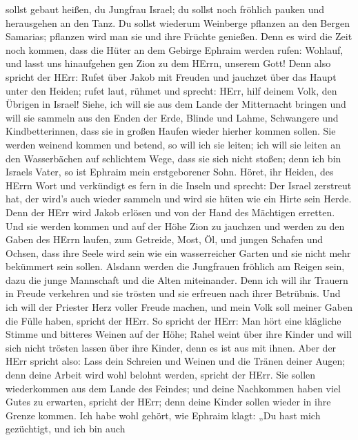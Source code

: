 sollst gebaut heißen, du Jungfrau Israel; du sollst noch fröhlich pauken
und herausgehen an den Tanz.  Du sollst wiederum Weinberge
pflanzen an den Bergen Samarias; pflanzen wird man sie und ihre Früchte
genießen.  Denn es wird die Zeit noch kommen, dass die Hüter
an dem Gebirge Ephraim werden rufen: Wohlauf, und lasst uns hinaufgehen
gen Zion zu dem HErrn, unserem Gott!  Denn also spricht der
HErr: Rufet über Jakob mit Freuden und jauchzet über das Haupt unter den
Heiden; rufet laut, rühmet und sprecht: HErr, hilf deinem Volk, den
Übrigen in Israel!  Siehe, ich will sie aus dem Lande der
Mitternacht bringen und will sie sammeln aus den Enden der Erde, Blinde
und Lahme, Schwangere und Kindbetterinnen, dass sie in großen Haufen
wieder hierher kommen sollen.  Sie werden weinend kommen und
betend, so will ich sie leiten; ich will sie leiten an den Wasserbächen
auf schlichtem Wege, dass sie sich nicht stoßen; denn ich bin Israels
Vater, so ist Ephraim mein erstgeborener Sohn.  Höret, ihr
Heiden, des HErrn Wort und verkündigt es fern in die Inseln und sprecht:
Der Israel zerstreut hat, der wird's auch wieder sammeln und wird sie
hüten wie ein Hirte sein Herde.  Denn der HErr wird Jakob
erlösen und von der Hand des Mächtigen erretten.  Und sie
werden kommen und auf der Höhe Zion zu jauchzen und werden zu den Gaben
des HErrn laufen, zum Getreide, Most, Öl, und jungen Schafen und Ochsen,
dass ihre Seele wird sein wie ein wasserreicher Garten und sie nicht
mehr bekümmert sein sollen.  Alsdann werden die Jungfrauen
fröhlich am Reigen sein, dazu die junge Mannschaft und die Alten
miteinander. Denn ich will ihr Trauern in Freude verkehren und sie
trösten und sie erfreuen nach ihrer Betrübnis.  Und ich
will der Priester Herz voller Freude machen, und mein Volk soll meiner
Gaben die Fülle haben, spricht der HErr.  So spricht der
HErr: Man hört eine klägliche Stimme und bitteres Weinen auf der Höhe;
Rahel weint über ihre Kinder und will sich nicht trösten lassen über
ihre Kinder, denn es ist aus mit ihnen.  Aber der HErr
spricht also: Lass dein Schreien und Weinen und die Tränen deiner Augen;
denn deine Arbeit wird wohl belohnt werden, spricht der HErr. Sie sollen
wiederkommen aus dem Lande des Feindes;  und deine
Nachkommen haben viel Gutes zu erwarten, spricht der HErr; denn deine
Kinder sollen wieder in ihre Grenze kommen.  Ich habe wohl
gehört, wie Ephraim klagt: „Du hast mich gezüchtigt, und ich bin auch

